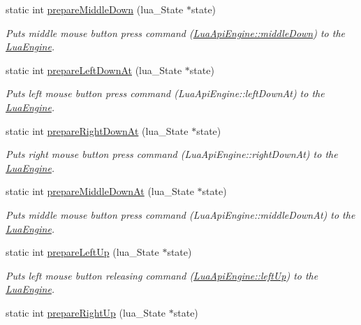 \begin{DoxyCompactItemize}
static int \hyperlink{class_lua_api_engine_a5cd6791cd7b80bb58c0e917f1c35369c}{prepare\-Middle\-Down} (lua\-\_\-\-State $\ast$state)
\begin{DoxyCompactList}\small\item\em Puts middle mouse button press command (\hyperlink{class_lua_api_engine_abea870a5edb171b0bc2345dd1e1e7b95}{Lua\-Api\-Engine\-::middle\-Down}) to the \hyperlink{class_lua_engine}{Lua\-Engine}. \end{DoxyCompactList}\item 
static int \hyperlink{class_lua_api_engine_a15078a5e7a8cedb80f088703b587ec81}{prepare\-Left\-Down\-At} (lua\-\_\-\-State $\ast$state)
\begin{DoxyCompactList}\small\item\em Puts left mouse button press command (Lua\-Api\-Engine\-::left\-Down\-At) to the \hyperlink{class_lua_engine}{Lua\-Engine}. \end{DoxyCompactList}\item 
static int \hyperlink{class_lua_api_engine_a1798695ce32c9d6526a8818535dbc7cf}{prepare\-Right\-Down\-At} (lua\-\_\-\-State $\ast$state)
\begin{DoxyCompactList}\small\item\em Puts right mouse button press command (Lua\-Api\-Engine\-::right\-Down\-At) to the \hyperlink{class_lua_engine}{Lua\-Engine}. \end{DoxyCompactList}\item 
static int \hyperlink{class_lua_api_engine_a6862d91bd6f2a46f7a86f0a5d19c7545}{prepare\-Middle\-Down\-At} (lua\-\_\-\-State $\ast$state)
\begin{DoxyCompactList}\small\item\em Puts middle mouse button press command (Lua\-Api\-Engine\-::middle\-Down\-At) to the \hyperlink{class_lua_engine}{Lua\-Engine}. \end{DoxyCompactList}\item 
static int \hyperlink{class_lua_api_engine_ad60b37dcca8dc42b6a70219b5b9fce95}{prepare\-Left\-Up} (lua\-\_\-\-State $\ast$state)
\begin{DoxyCompactList}\small\item\em Puts left mouse button releasing command (\hyperlink{class_lua_api_engine_a926f72169c400bb32186737f03208e1c}{Lua\-Api\-Engine\-::left\-Up}) to the \hyperlink{class_lua_engine}{Lua\-Engine}. \end{DoxyCompactList}\item 
static int \hyperlink{class_lua_api_engine_a6777e46c87e999bd66c4ae349a9078cf}{prepare\-Right\-Up} (lua\-\_\-\-State $\ast$state)

\end{DoxyCompactItemize}
